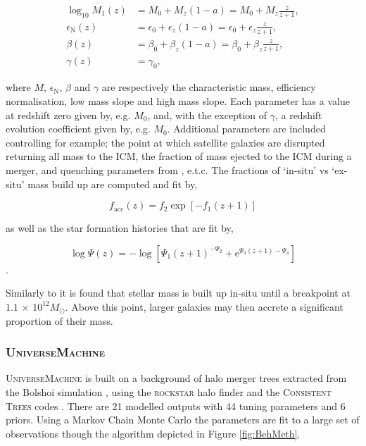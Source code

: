\begin{equation}
\begin{aligned} \log _{10} M_{1}(z) &=M_{0}+M_{z}(1-a)=M_{0}+M_{z} \frac{z}{z+1}, \\ \epsilon_{\mathrm{N}}(z) &=\epsilon_{0}+\epsilon_{z}(1-a)=\epsilon_{0}+\epsilon_{z} \frac{z}{z+1}, \\ \beta(z) &=\beta_{0}+\beta_{z}(1-a)=\beta_{0}+\beta_{z} \frac{z}{z+1}, \\ \gamma(z) &=\gamma_{0}, \end{aligned}
\end{equation}

where $M$, $\epsilon_{\mathrm{N}}$, $\beta$ and $\gamma$ are respectively the characteristic mass, efficiency normalisation, low mass slope and high mass slope. Each parameter has a value at redshift zero given by, e.g. $M_{0}$, and, with the exception of $\gamma$, a redshift evolution coefficient given by, e.g. $M_{0}$. Additional parameters are included controlling for example; the point at which satellite galaxies are disrupted returning all mass to the ICM, the fraction of mass ejected to the ICM during a merger, and quenching parameters from \citet{Wetzel2013GalaxyUniverse}, e.t.c. The fractions of `in-situ' vs `ex-situ' mass build up are computed and fit by,

\begin{equation}
f_{\mathrm{acc}}(z) =f_{2} \exp \left[-f_{1}(z+1)\right] 
\end{equation}

as well as the star formation histories that are fit by,

\begin{equation}
\log \Psi(z) =-\log \left[\Psi_{1}(z+1)^{-\Psi_{2}}+\mathrm{e}^{\Psi_{3}(z+1)-\Psi_{4}}\right] 
\end{equation}.

Similarly to \citet{Rodriguez-Puebla2017ConstrainingProperties} it is found that stellar mass is built up in-situ until a breakpoint at $1.1$ $\times$ $10^{12} M_{\odot}$. Above this point, larger galaxies may then accrete a significant proportion of their mass.

\subsubsection{U\textsc{niverse}M\textsc{achine}}
U\textsc{niverse}M\textsc{achine} \cite{Behroozi2019UniverseMachine:010} is built on a background of halo merger trees extracted from the Bolshoi simulation \citep{Klypin2016,Rodriguez-Puebla2016HaloSimulations}, using the \textsc{rockstar} halo finder and the C\textsc{onsistent} T\textsc{rees} codes \cite{Behroozi2011TheCores, Behroozi2013GRAVITATIONALLYCOSMOLOGY}. There are 21 modelled outputs with 44 tuning parameters and 6 priors. Using a Markov Chain Monte Carlo the parameters are fit to a large set of observations though the algorithm depicted in Figure \ref{fig:BehMeth}.

